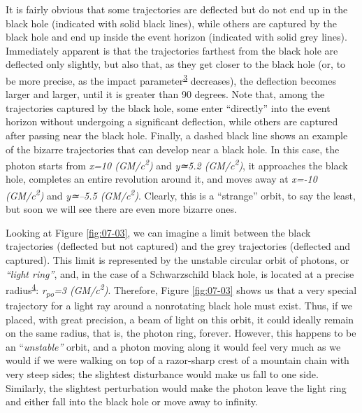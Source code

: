It is fairly obvious that some trajectories are deflected but do not end up in the black
hole (indicated with solid black lines), while others are captured by the black hole and
end up inside the event horizon (indicated with solid grey lines). Immediately apparent
is that the trajectories farthest from the black hole are deflected only slightly, but
also that, as they get closer to the black hole (or, to be more precise, as the impact
parameter\textsuperscript{\hyperlink{note:07-03}{3}} decreases), the deflection becomes larger and larger, until
it is greater than 90 degrees. Note that, among the trajectories captured by the black
hole, some enter ``directly'' into the event horizon without undergoing a significant
deflection, while others are captured after passing near the black hole. Finally, a
dashed black line shows an example of the bizarre trajectories that can develop near a
black hole. In this case, the photon starts from \emph{x=10 (GM/c\textsuperscript{2})}
and \emph{y≃5.2 (GM/c\textsuperscript{2})}, it approaches the black hole, completes an
entire revolution around it, and moves away at \emph{x=-10 (GM/c\textsuperscript{2})}
and \emph{y≃--5.5 (GM/c\textsuperscript{2})}. Clearly, this is a ``strange'' orbit, to
say the least, but soon we will see there are even more bizarre ones.

Looking at Figure \ref{fig:07-03}, we can imagine a limit between the black trajectories (deflected
but not captured) and the grey trajectories (deflected and captured). This limit is
represented by the unstable circular orbit of photons, or
\emph{``light ring''}, and, in the case of a Schwarzschild black
hole, is located at a precise radius\textsuperscript{\hyperlink{note:07-04}{4}}:
\emph{r\textsubscript{po}=3 (GM/c\textsuperscript{2})}. Therefore, Figure \ref{fig:07-03} shows us
that a very special trajectory for a light ray around a nonrotating black hole must
exist. Thus, if we placed, with great precision, a beam of light on this orbit, it could
ideally remain on the same radius, that is, the photon ring, forever.
However, this happens to be an ``\emph{unstable''} orbit, and a
photon moving along it would feel very much as we would if we were walking on top of a
razor-sharp crest of a mountain chain with very steep sides; the slightest disturbance
would make us fall to one side. Similarly, the slightest perturbation would make the
photon leave the light ring and either fall into the black hole or move away to
infinity.

